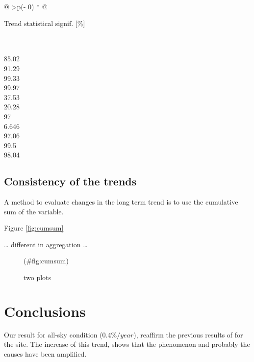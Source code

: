 \documentclass[preprint, 3p,
authoryear]{elsarticle} %
\begin{document}
\begin{longtable}[]{@{}
  >{\centering\arraybackslash}p{(\columnwidth - 0\tabcolsep) * }@{}}
\toprule\noalign{}
\begin{minipage}[b]{\linewidth}\centering
Trend statistical signif. {[}\%{]}
\end{minipage} \\
\midrule\noalign{}
\endhead
\bottomrule\noalign{}
 \\
85.02 \\
91.29 \\
99.33 \\
99.97 \\
37.53 \\
20.28 \\
97 \\
6.646 \\
97.06 \\
99.5 \\
98.04 \\
\end{longtable}

\hypertarget{consistency-of-the-trends}{%
\subsection{Consistency of the trends}\label{consistency-of-the-trends}}

A method to evaluate changes in the long term trend is to use the
cumulative sum of the variable.

Figure \ref{fig:cumsum}

\ldots{} different in aggregation \ldots{}

\begin{figure}[h!]

{\centering {}

}

\caption{two plots}(\#fig:cumsum)
\end{figure}

\hypertarget{conclusions}{%
\section{Conclusions}\label{conclusions}}

Our result for all-sky condition (\(0.4\%/year\)), reaffirm the previous
results of \citet{Bais2013} for the site. The increase of this trend,
shows that the phenomenon and probably the causes have been amplified.
\end{document}
